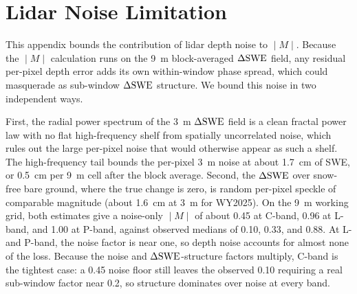 \documentclass[journal abbreviation, manuscript]{copernicus}
\begin{document}











\appendix
\section{Lidar Noise Limitation}    %

This appendix bounds the contribution of lidar depth noise to $∣M∣$. Because the $∣M∣$ calculation runs on the 9~m block-averaged $\Delta\mathrm{SWE}$ field, any residual per-pixel depth error adds its own within-window phase spread, which could masquerade as sub-window $\Delta\mathrm{SWE}$ structure. We bound this noise in two independent ways.

First, the radial power spectrum of the 3~m $\Delta\mathrm{SWE}$ field is a clean fractal power law with no flat high-frequency shelf from spatially uncorrelated noise, which rules out the large per-pixel noise that would otherwise appear as such a shelf. The high-frequency tail bounds the per-pixel 3~m noise at about 1.7~cm of SWE, or 0.5~cm per 9~m cell after the block average. Second, the $\Delta\mathrm{SWE}$ over snow-free bare ground, where the true change is zero, is random per-pixel speckle of comparable magnitude (about 1.6~cm at 3~m for WY2025). On the 9~m working grid, both estimates give a noise-only $∣M∣$ of about 0.45 at C-band, 0.96 at L-band, and 1.00 at P-band, against observed medians of 0.10, 0.33, and 0.88. At L- and P-band, the noise factor is near one, so depth noise accounts for almost none of the loss. Because the noise and $\Delta\mathrm{SWE}$-structure factors multiply, C-band is the tightest case: a 0.45 noise floor still leaves the observed 0.10 requiring a real sub-window factor near 0.2, so structure dominates over noise at every band.
\end{document}
